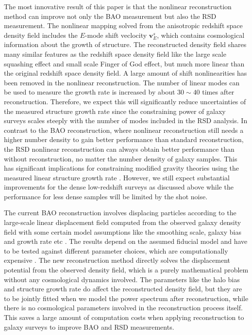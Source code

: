 \documentclass[aps,prd,twocolumn,superscriptaddress,groupedaddress,nofootinbib,amsfont]{revtex4}  %
\begin{document}
The most innovative result of this paper is that the nonlinear reconstruction
method can improve not only the BAO measurement but also the RSD measurement.
The nonlinear mapping solved from the anisotropic redshift space density field
includes the $E$-mode shift veclocity $\bm{v}^s_E$, which contains cosmological
information about the growth of structure. 
The reconstructed density field shares many similar features as the redshift 
space density field like the large scale squashing effect and small scale 
Finger of God effect, but much more linear than the original redshift space 
density field. A large amount of shift nonlinearities has been removed in the
nonlinear reconstruction. The number of linear modes can be used to measure the
growth rate is increased by about $30\sim40$ times after reconstruction. 
Therefore, we expect this will significantly reduce uncertainties of the 
measured structure growth rate since the constraining power of galaxy surveys
scales steeply with the number of modes included in the RSD analysis.
In contrast to the BAO reconstruction, where nonlinear reconstruction still 
needs a higher number density to gain better performance than standard 
reconstruction, the RSD nonlinear reconstruction can always obtain better 
performance than without reconstruction, no matter the number density of galaxy 
samples. This has significant implications for constraining modified gravity
theories using the measured linear structure growth rate \cite{2017Yu1}.
However, we still expect substantial improvements for the dense low-redshift 
surveys as discussed above while the performance for less dense samples
will be limited by the shot noise. 

The current BAO reconstruction involves displacing particles according to the 
large-scale linear displacement field computed from the observed galaxy density
field with some certain model assumptions like the smoothing scale, galaxy bias
and growth rate etc \cite{2007bao}. The results depend on the assumed fiducial
model and have to be tested against different parameter choices, which are 
computationally expensive \cite{2012nikhil}.
The new reconstruction method directly solves the displacement potential from 
the observed density field, which is a purely mathematical problem without any
cosmological dynamics involved.
The parameters like the halo bias and structure growth rate do affect the 
reconstructed density field, but they are to be jointly fitted when we model 
the power spectrum after reconstruction, while there is no cosmological 
parameters involved in the reconstruction process itself.
This saves a large amount of computation costs when applying reconstruction to 
galaxy surveys to improve BAO and RSD measurements.
\end{document}
